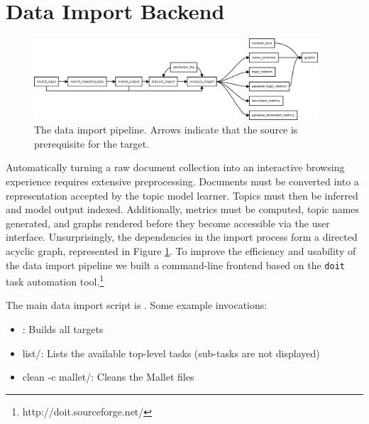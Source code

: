 \documentclass[11pt]{article}
\begin{document}
\section{Data Import Backend}
\begin{figure}[t]
 \centering
 \includegraphics[width=400px,keepaspectratio=true]{./build_flowchart.png}
 \caption{The data import pipeline. Arrows indicate that the source is prerequisite for the target.}
 \label{fig:build_flowchart}
\end{figure}

Automatically turning a raw document collection into an interactive browsing
experience requires extensive preprocessing. Documents must be converted into a
representation accepted by the topic model learner. Topics must then be inferred
and model output indexed. Additionally, metrics must be computed, topic names
generated, and graphs rendered before they become accessible via the user
interface. Unsurprisingly, the dependencies in the import process form a directed acyclic graph, represented in Figure \ref{fig:build_flowchart}. To
improve the efficiency and usability of the data import pipeline we built a
command-line frontend based on the \texttt{doit} task automation tool.\footnote{http://doit.sourceforge.net/}

The main data import script is \texttt{\buildscript}. Some example invocations:
\begin{itemize}
 \item \texttt{\buildscript}: Builds all targets
 \item \texttt{\buildscript} list/: Lists the available top-level tasks (sub-tasks are not displayed)
 \item \texttt{\buildscript} clean -c mallet/: Cleans the Mallet files
\end{itemize}

\end{document}
